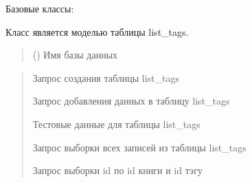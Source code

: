 \documentclass[letterpaper,10pt,russian]{sphinxmanual}
\begin{document}
\begin{fulllineitems}
\label{\detokenize{database.sqlite3_interface.tables:database.sqlite3_interface.tables.list_tags.ListTags}}
\pysigstartsignatures
{}
\pysigstopsignatures
\sphinxAtStartPar
Базовые классы: {\hyperref[\detokenize{database.sqlite3_interface.tables:database.sqlite3_interface.tables.table.Table}]{}}

\sphinxAtStartPar
Класс является моделью таблицы list\_tags.
\begin{quote}\begin{description}
\sphinxAtStartPar
{} () \textendash{} Имя базы данных

\end{description}\end{quote}
\begin{description}
\begin{quote}\begin{description}
\sphinxAtStartPar
Запрос создания таблицы list\_tags

\sphinxAtStartPar
Запрос добавления данных в таблицу list\_tags

\sphinxAtStartPar
Тестовые данные для таблицы list\_tags

\sphinxAtStartPar
Запрос выборки всех записей из таблицы list\_tags

\sphinxAtStartPar
Запрос выборки id по id книги и id тэгу

\end{description}\end{quote}


\end{description}
\end{fulllineitems}
\end{document}
